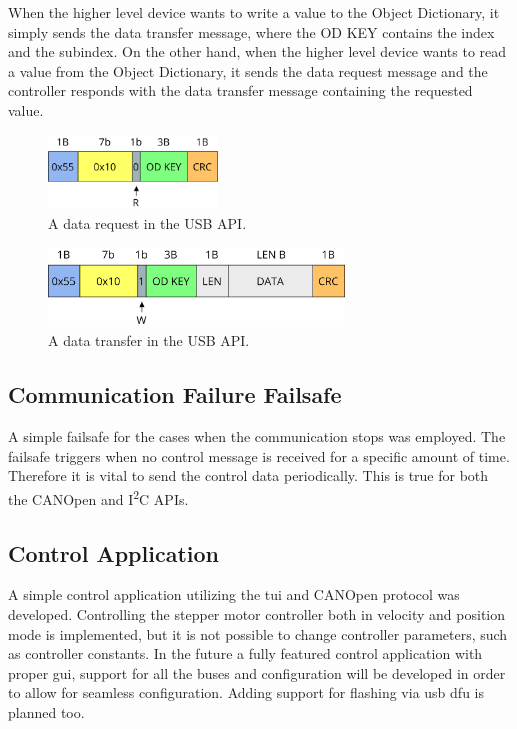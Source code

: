 When the higher level device wants to write a value to the Object Dictionary, it simply sends the data transfer message, where the OD KEY contains the index and the subindex.
On the other hand, when the higher level device wants to read a value from the Object Dictionary, it sends the data request message and the controller responds with the data transfer message containing the requested value.

\begin{figure}[H]
    \centering
    \includegraphics[width=0.4\textwidth]{obrazky/usb_request}
    \caption{A data request in the USB API.}
    \label{fig:usb_request}
\end{figure}

\begin{figure}[H]
    \centering
    \includegraphics[width=0.7\textwidth]{obrazky/usb_transfer}
    \caption{A data transfer in the USB API.}
    \label{fig:usb_tansfer}
\end{figure}

\subsection{Communication Failure Failsafe}
A simple failsafe for the cases when the communication stops was employed.
The failsafe triggers when no control message is received for a specific amount of time.
Therefore it is vital to send the control data periodically.
This is true for both the CANOpen and I\textsuperscript{2}C APIs.


\subsection{Control Application}
A simple control application utilizing the \acs{tui} and CANOpen protocol was developed.
Controlling the stepper motor controller both in velocity and position mode is implemented, but it is not possible to change controller parameters, such as controller constants.
In the future a fully featured control application with proper \acs{gui}, support for all the buses and configuration will be developed in order to allow for seamless configuration.
Adding support for flashing via \acs{usb} \acs{dfu} is planned too.

